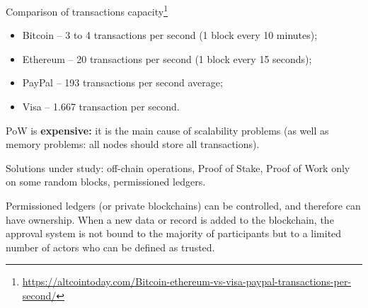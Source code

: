 Comparison of transactions capacity\footnote{\url{https://altcointoday.com/Bitcoin-ethereum-vs-visa-paypal-transactions-per-second/}}
\begin{itemize}
    \item Bitcoin -- 3 to 4 transactions per second (1 block every 10 minutes);
    \item Ethereum -- 20 transactions per second (1 block every 15 seconds);
    \item PayPal -- 193 transactions per second average;
    \item Visa -- 1.667 transaction per second.
\end{itemize}

PoW is \textbf{expensive:} it is the main cause of scalability problems (as well as memory problems: all nodes should store all transactions).

Solutions under study: off-chain operations, Proof of Stake, Proof of Work only on some random blocks, permissioned ledgers.

Permissioned ledgers (or private blockchains) can be controlled, and therefore can have ownership. When a new data or record is added to the blockchain, the approval system is not bound to the majority of participants but to a limited number of actors who can be defined as trusted.

